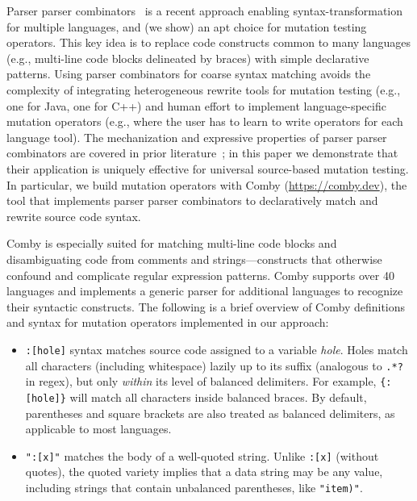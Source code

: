 \documentclass[acmsmall]{acmart}
\begin{document}
{Parser parser combinators~\cite{vanTonderPPC} is a recent approach enabling
syntax-transformation for multiple languages, and (we show) an apt choice for
mutation testing operators. This key idea is to replace code constructs
common to many languages (e.g., multi-line code blocks delineated by braces)
with simple declarative patterns. Using parser combinators for coarse syntax
matching avoids the complexity of integrating heterogeneous rewrite tools for
mutation testing (e.g., one for Java, one for C++) and human effort to
implement language-specific mutation operators (e.g., where the user has to
learn to write operators for each language tool). The mechanization and
expressive properties of parser parser combinators are covered in prior
literature~\cite{vanTonderPPC}; in this paper we demonstrate that their application is
uniquely effective for universal source-based mutation testing. In
particular, we
build mutation operators with Comby (\url{https://comby.dev}), the tool that implements parser parser
combinators to declaratively match and rewrite source code syntax. 

Comby is especially suited for matching multi-line code blocks and
disambiguating code from comments and strings---constructs that otherwise
confound and complicate regular expression patterns. Comby supports over 40
languages and implements a generic parser for additional languages to recognize
their syntactic constructs. The following is a brief overview of Comby
definitions and syntax for mutation operators implemented in our approach:

\begin{itemize}

\item \texttt{\small:[hole]} syntax matches source code assigned to a variable \emph{hole}. Holes match all characters (including whitespace) lazily up to its suffix (analogous to \texttt{\small.*?} in regex), but only \emph{within} its level of balanced delimiters. For example, \texttt{\small\{:[hole]\}} will match all characters inside balanced braces. By default, parentheses and square brackets are also treated as balanced delimiters, as applicable to most languages. 

\item \texttt{\small ":[x]"} matches the body of a well-quoted string. Unlike \texttt{\small :[x]} (without quotes), the quoted variety implies that a data string may be any value, including strings that contain unbalanced parentheses, like \texttt{\small "item)"}.


\end{itemize}}
\end{document}
